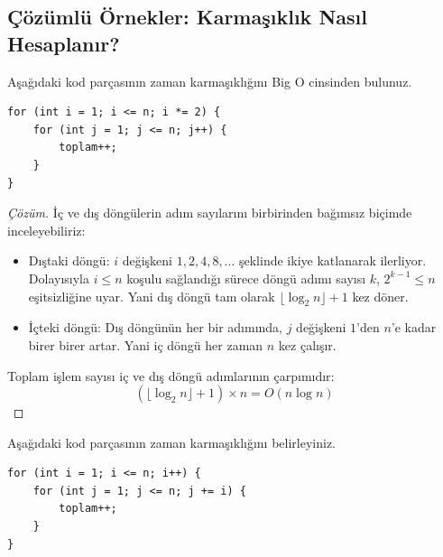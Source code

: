 \subsection{Çözümlü Örnekler: Karmaşıklık Nasıl Hesaplanır?}

\begin{example}
Aşağıdaki kod parçasının zaman karmaşıklığını Big O cinsinden bulunuz.

\begin{lstlisting}[language=CTemel]
for (int i = 1; i <= n; i *= 2) {
    for (int j = 1; j <= n; j++) {
        toplam++;
    }
}
\end{lstlisting}
\end{example}

\begin{proof}[Çözüm]
İç ve dış döngülerin adım sayılarını birbirinden bağımsız biçimde inceleyebiliriz:
\begin{itemize}
    \item Dıştaki döngü: $i$ değişkeni $1, 2, 4, 8, \dots$ şeklinde ikiye katlanarak ilerliyor. Dolayısıyla $i \le n$ koşulu sağlandığı sürece döngü adımı sayısı $k$, $2^{k-1} \le n$ eşitsizliğine uyar. Yani dış döngü tam olarak $\lfloor \log_2 n \rfloor + 1$ kez döner.
    \item İçteki döngü: Dış döngünün her bir adımında, $j$ değişkeni $1$'den $n$'e kadar birer birer artar. Yani iç döngü her zaman $n$ kez çalışır.
\end{itemize}
Toplam işlem sayısı iç ve dış döngü adımlarının çarpımıdır:
\[ (\lfloor \log_2 n \rfloor + 1) \times n = O(n \log n) \]
\end{proof}

\begin{example}
Aşağıdaki kod parçasının zaman karmaşıklığını belirleyiniz.

\begin{lstlisting}[language=CTemel]
for (int i = 1; i <= n; i++) {
    for (int j = 1; j <= n; j += i) {
        toplam++;
    }
}
\end{lstlisting}
\end{example}

